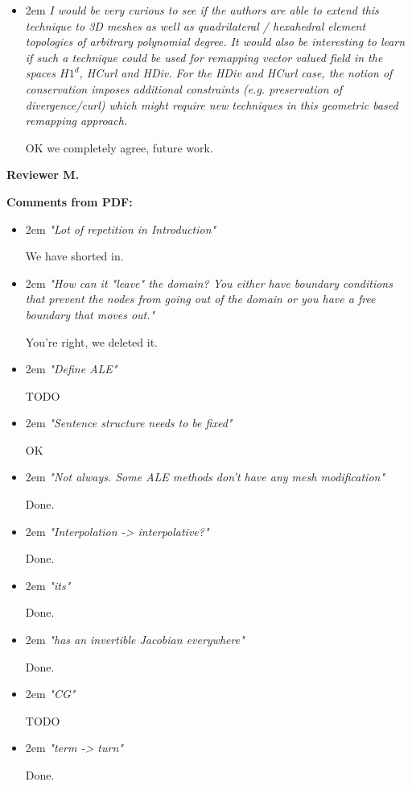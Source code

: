 \documentclass{letter}
\renewcommand{\rq}[1]{\begin{addmargin}[2em]{2em}
\it
#1
\end{addmargin}\vspace{12pt}}
\begin{document}
\begin{letter}{}
\begin{itemize}
Danny looks into increasing delta, then we decide.
  
\item \rq{I would be very curious to see if the authors are able to extend this technique to 3D meshes as well as quadrilateral / hexahedral element topologies of arbitrary polynomial degree. It would also be interesting to learn if such a technique could be used for remapping vector valued field in the spaces $H1^d$, HCurl and HDiv. For the HDiv and HCurl case, the notion of conservation imposes additional constraints (e.g. preservation of divergence/curl) which might require new techniques in this geometric based remapping approach.}

OK we completely agree, future work.
  
\end{itemize}


\textbf{Reviewer M.}

\textbf{Comments from PDF:}

\begin{itemize} \renewcommand\labelitemi{--}

\item \rq{ "Lot of repetition in Introduction"}

We have shorted in.
  
\item \rq{ "How can it "leave" the domain? You either have boundary conditions that prevent the nodes from going out of the domain or you have a free boundary that moves out."}

You're right, we deleted it.
  
\item \rq{ "Define ALE"}

TODO
  
\item \rq{ "Sentence structure needs to be fixed"}

OK
  
\item \rq{ "Not always. Some ALE methods don't have any mesh modification"}

Done.
  
\item \rq{ "Interpolation -> interpolative?"}

Done.
  
\item \rq{ "its"}

  Done.

  
\item \rq{ "has an invertible Jacobian everywhere"}

  Done.
  
\item \rq{ "CG"}

  TODO
  
\item \rq{ "term -> turn"}

Done.
  
\end{itemize}




\end{letter}
\end{document}
